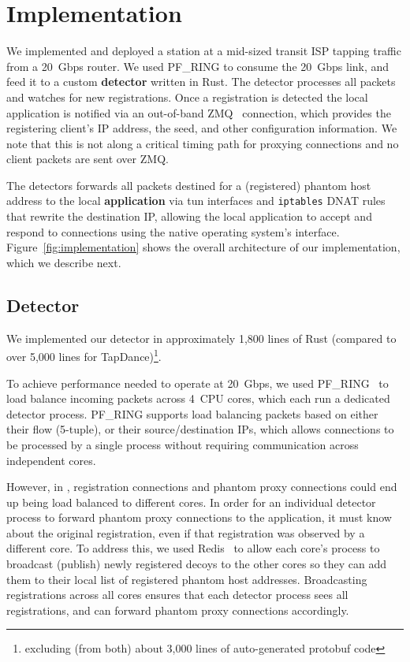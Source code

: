 \documentclass[sigconf]{acmart}
\begin{document}
\TabApplications


\section{Implementation}
\label{sec:implementation}

We implemented \scheme and deployed a station at a mid-sized transit ISP tapping 
traffic from a 20~Gbps router. We used PF\_RING to
consume the 20~Gbps link, and feed it to a custom \textbf{detector} written in Rust. The
detector processes all packets and watches for new registrations. Once a registration 
is detected the local application is notified via an 
out-of-band ZMQ~\cite{zmq} connection, which provides the
registering client's IP address, the seed, and other configuration
information. We note that this is not along a critical timing path for 
proxying connections and no client packets are sent over ZMQ.

The detectors forwards all packets destined for a (registered) phantom host address to the local
\textbf{application} via tun interfaces and \texttt{iptables} DNAT rules that rewrite the destination IP,
allowing the local application to accept and respond to connections using the native
operating system's interface. Figure~\ref{fig:implementation} shows the overall
architecture of our implementation, which we describe next.

\FigImplementation

\subsection{Detector}

We implemented our detector in approximately 1,800 lines of Rust (compared to
over 5,000 lines for TapDance)\footnote{excluding (from both) about 3,000 lines
of auto-generated protobuf code}.

To achieve performance needed to operate at 20~Gbps, we used
PF\_RING~\cite{pfring} to load balance incoming packets across 4~CPU cores,
which each run a dedicated detector process.
PF\_RING supports load balancing packets based on
either their flow (5-tuple), or their source/destination IPs, which allows
connections to be processed by a single process without
requiring communication across independent cores.

However, in \scheme, registration connections and phantom proxy connections
could end up being load balanced to different cores. In order for an individual
detector process to forward phantom proxy connections to the application, it must
know about the original registration, even if that registration was observed by a
different core.
To address this, we used Redis~\cite{redis} to allow each core's process to broadcast
(publish) newly registered decoys to the other cores so they can
add them to their local list of registered phantom host addresses. Broadcasting
registrations across all cores ensures that each detector process sees all
registrations, and can forward phantom proxy connections accordingly.
\end{document}
